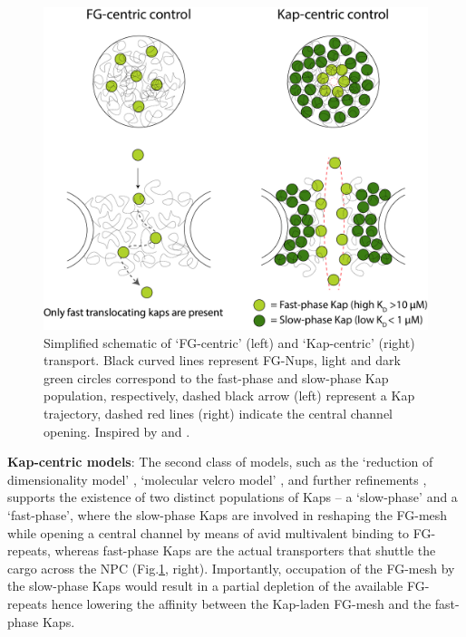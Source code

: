 \begin{figure}[!htbp]
	\centering
	\includegraphics[width=1\linewidth]{figures/Figure1.5.pdf}
	\caption{Simplified schematic of ‘FG-centric’ (left) and ‘Kap-centric’ (right) transport. Black curved lines represent FG-Nups, light and dark green circles correspond to the fast-phase and slow-phase Kap population, respectively, dashed black arrow (left) represent a Kap trajectory, dashed red lines (right) indicate the central channel opening. Inspired by \cite{Kapinos2014} and \cite{Kapinos2017a}.}
	\label{fig:fig1.5}
\end{figure}
\newpage
\noindent\textbf{Kap-centric models}: The second class of models, such as the ‘reduction of dimensionality model’ \cite{Peters2005}, ‘molecular velcro model’ \cite{Schleicher2014}, and further refinements \cite{Kapinos2014,Lim2015,Wagner2015,Kapinos2017a,Barbato*2020}, supports the existence of two distinct populations of Kaps – a ‘slow-phase’ and a ‘fast-phase’, where the slow-phase Kaps are involved in reshaping the FG-mesh while opening a central channel by means of avid multivalent binding to FG-repeats, whereas fast-phase Kaps are the actual transporters that shuttle the cargo across the NPC (Fig.\ref{fig:fig1.5}, right).  Importantly, occupation of the FG-mesh by the slow-phase Kaps would result in a partial depletion of the available FG-repeats hence lowering the affinity between the Kap-laden FG-mesh and the fast-phase Kaps.

